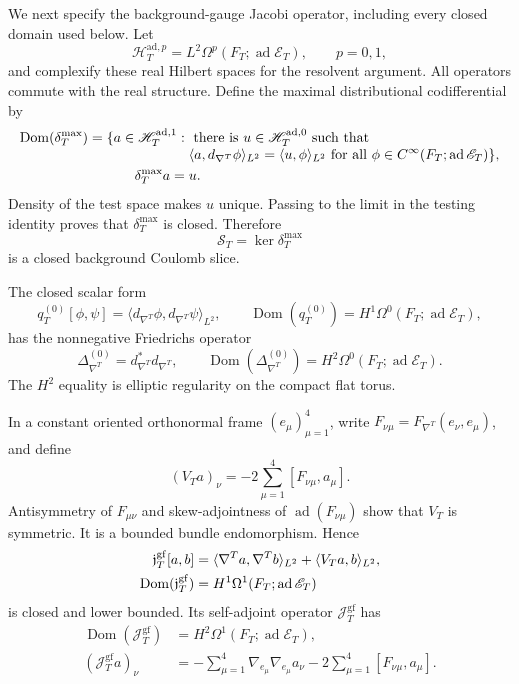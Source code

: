 \documentclass[11pt]{article}
\theoremstyle{definition}
\numberwithin{equation}{section}
\begin{document}
We next specify the background-gauge Jacobi operator, including every closed
domain used below.  Let
\[
 \mathscr H_T^{\mathrm{ad},p}
 =L^2\Omega^p(F_T;\operatorname{ad}\mathscr E_T),
 \qquad p=0,1,
\]
and complexify these real Hilbert spaces for the resolvent argument.  All
operators commute with the real structure.  Define the maximal distributional
codifferential by
\begin{align}
 \operatorname{Dom}(\delta_T^{\max})
 =\{a\in\mathscr H_T^{\mathrm{ad},1}:{}&\text{ there is }u\in
 \mathscr H_T^{\mathrm{ad},0}\text{ such that}\\[-1mm]
 &\langle a,d_{\nabla^T}\phi\rangle_{L^2}
 =\langle u,\phi\rangle_{L^2}
 \text{ for all }\phi\in
 C^\infty(F_T;\operatorname{ad}\mathscr E_T)\},
 \label{cusp-link-magnetic-max-codiff-domain}\\
 \delta_T^{\max}a={}&u.\notag
\end{align}
Density of the test space makes \(u\) unique.  Passing to the limit in the
testing identity proves that \(\delta_T^{\max}\) is closed.  Therefore
\begin{equation}
 \mathscr S_T=\ker\delta_T^{\max}
 \label{cusp-link-magnetic-coulomb-slice}
\end{equation}
is a closed background Coulomb slice.

The closed scalar form
\[
 q_T^{(0)}[\phi,\psi]
 =\langle d_{\nabla^T}\phi,d_{\nabla^T}\psi\rangle_{L^2},
 \qquad
 \operatorname{Dom}(q_T^{(0)})
 =H^1\Omega^0(F_T;\operatorname{ad}\mathscr E_T),
\]
has the nonnegative Friedrichs operator
\begin{equation}
 \Delta_{\nabla^T}^{(0)}=d_{\nabla^T}^*d_{\nabla^T},
 \qquad
 \operatorname{Dom}(\Delta_{\nabla^T}^{(0)})
 =H^2\Omega^0(F_T;\operatorname{ad}\mathscr E_T).
 \label{cusp-link-magnetic-scalar-domain}
\end{equation}
The \(H^2\) equality is elliptic regularity on the compact flat torus.

In a constant oriented orthonormal frame \((e_\mu)_{\mu=1}^4\), write
\(F_{\nu\mu}=F_{\nabla^T}(e_\nu,e_\mu)\), and define
\[
 (V_Ta)_\nu=-2\sum_{\mu=1}^4[F_{\nu\mu},a_\mu].
\]
Antisymmetry of \(F_{\mu\nu}\) and skew-adjointness of
\(\operatorname{ad}(F_{\nu\mu})\) show that \(V_T\) is symmetric.  It is a
bounded bundle endomorphism.  Hence
\begin{align}
 \mathfrak j_T^{\mathrm{gf}}[a,b]
 &=\langle\nabla^Ta,\nabla^Tb\rangle_{L^2}
   +\langle V_Ta,b\rangle_{L^2},
 \label{cusp-link-magnetic-jacobi-form}\\
 \operatorname{Dom}(\mathfrak j_T^{\mathrm{gf}})
 &=H^1\Omega^1(F_T;\operatorname{ad}\mathscr E_T)\notag
\end{align}
is closed and lower bounded.  Its self-adjoint operator
\(\mathcal J_T^{\mathrm{gf}}\) has
\begin{align}
 \operatorname{Dom}(\mathcal J_T^{\mathrm{gf}})
 &=H^2\Omega^1(F_T;\operatorname{ad}\mathscr E_T),
 \label{cusp-link-magnetic-full-jacobi-domain}\\
 (\mathcal J_T^{\mathrm{gf}}a)_\nu
 &=-\sum_{\mu=1}^4\nabla_{e_\mu}\nabla_{e_\mu}a_\nu
   -2\sum_{\mu=1}^4[F_{\nu\mu},a_\mu].
 \label{cusp-link-magnetic-jacobi-expression}
\end{align}
\end{document}
